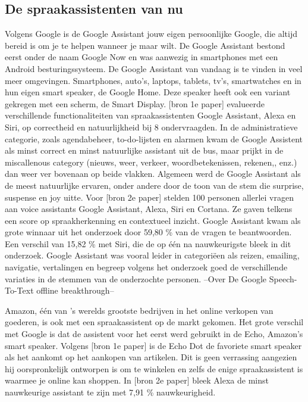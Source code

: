 \subsection{De spraakassistenten van nu}
Volgens Google is de Google Assistant jouw eigen persoonlijke Google, die altijd bereid is om je te helpen wanneer je maar wilt. De Google Assistant bestond eerst onder de naam Google Now en was aanwezig in smartphones met een Android besturingssysteem. De Google Assistant van vandaag is te vinden in veel meer omgevingen. Smartphones, auto's, laptops, tablets, tv's, smartwatches en in hun eigen smart speaker, de Google Home. Deze speaker heeft ook een variant gekregen met een scherm, de Smart Display.
[bron 1e paper] evalueerde verschillende functionaliteiten van spraakassistenten Google Assistant, Alexa en Siri, op correctheid en natuurlijkheid bij 8 ondervraagden. In de administratieve categorie, zoals agendabeheer, to-do-lijsten en alarmen kwam de Google Assistent als minst correct en minst natuurlijke assistant uit de bus, maar prijkt in de miscallenous category (nieuws, weer, verkeer, woordbetekenissen, rekenen,, enz.) dan weer ver bovenaan op beide vlakken. Algemeen werd de Google Assistant als de meest natuurlijke ervaren, onder andere door de toon van de stem die surprise, suspense en joy uitte.
Voor [bron 2e paper] stelden 100 personen allerlei vragen aan voice assistants Google Assistant, Alexa, Siri en Cortana. Ze gaven telkens een score op spraakherkenning en contextueel inzicht. Google Assistant kwam als grote winnaar uit het onderzoek door 59,80 \% van de vragen te beantwoorden. Een verschil van 15,82 \% met Siri, die de op één na nauwkeurigste bleek in dit onderzoek. Google Assistant was vooral leider in categoriëen als reizen, emailing, navigatie, vertalingen en begreep volgens het onderzoek goed de verschillende variaties in de stemmen van de onderzochte personen.
--Over De Google Speech-To-Text offline breakthrough--

Amazon, één van 's werelds grootste bedrijven in het online verkopen van goederen, is ook met een spraakassistent op de markt gekomen. Het grote verschil met Google is dat de assistent voor het eerst werd gebruikt in de Echo, Amazon's smart speaker. Volgens [bron 1e paper] is de Echo Dot de favoriete smart speaker als het aankomt op het aankopen van artikelen. Dit is geen verrassing aangezien hij oorspronkelijk ontworpen is om te winkelen en zelfs de enige spraakassistent is waarmee je online kan shoppen. In [bron 2e paper] bleek Alexa de minst nauwkeurige assistant te zijn met 7,91 \% nauwkeurigheid.

